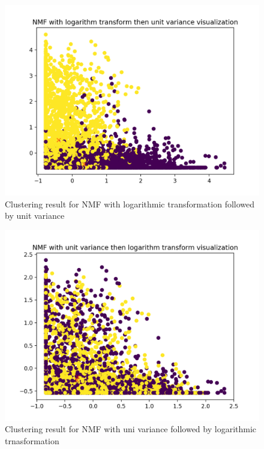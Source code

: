 \documentclass{report}
\begin{document}
\begin{figure}
  \includegraphics[width=\linewidth]{nmf_log-scalse_4b.png} 
  \vspace*{-20mm}
  \caption{Clustering result for NMF with logarithmic transformation followed by unit variance}
  \label{fig:nmf4}
\end{figure}

\begin{figure}
  \includegraphics[width=\linewidth]{nmf_scale-log_p4.png} 
  \vspace*{-20mm}
  \caption{Clustering result for NMF with uni variance followed by logarithmic trnasformation}
  \label{fig:nmf5}
\end{figure}
\end{document}
